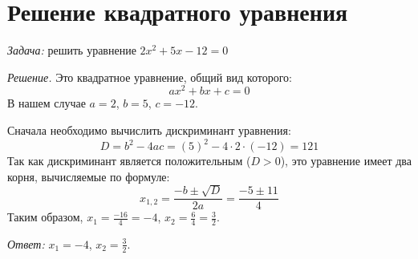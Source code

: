 \documentclass{article}
\begin{document}
\section{Решение квадратного уравнения}
\emph{Задача: }решить уравнение \(2x^2 + 5x - 12 = 0\) 

\emph{Решение.} Это квадратное уравнение, общий вид которого:
\[ax^2 + bx + c = 0\]
В нашем случае \(a = 2\), \(b = 5\), \(c = -12\).

Сначала необходимо вычислить дискриминант уравнения:
\[ D = b^2 - 4ac = (5)^2 - 4·2·(-12) = 121 \]
Так как дискриминант  является положительным (\(D > 0 \)), это уравнение имеет два корня, вычисляемые по формуле:
\[ x_{1,2}=\frac{-b\pm\sqrt{D}}{2a}=\frac{-5\pm11}{4} \]
Таким образом, \( x_{1} = \frac{-16}{4} = -4 \), \( x_{2} = \frac{6}{4} = \frac{3}{2} \).

\emph{Ответ: }\( x_{1} = -4 \), \( x_{2} = \frac{3}{2} \).
\end{document}
